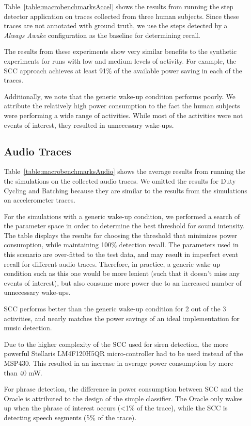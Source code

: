 Table~\ref{table:macrobenchmarksAccel} shows the results from running the
step detector application on traces collected from three human
subjects.  Since these traces are not annotated with ground truth, we
use the steps detected by a {\em Always Awake} configuration as the baseline for
determining recall.

The results from these experiments show very similar
benefits to the synthetic experiments for runs with low and medium
levels of activity.  For example, the SCC approach achieves
at least 91\% of the available power saving in each of the traces.  

Additionally, we note that the generic wake-up condition performs poorly.  We 
attribute the relatively high power consumption to the fact the human subjects 
were performing a wide range of activities.  While most of the activities were 
not events of interest, they resulted in unnecessary wake-ups.



\subsection{Audio Traces}

Table~\ref{table:macrobenchmarksAudio} shows the average results from running the
the simulations on the collected audio traces.  We omitted the results
for Duty Cycling and Batching because they are similar to the results from
the simulations on accelerometer traces.

For the simulations with a generic wake-up condition, we performed a search
of the parameter space in order to determine the best threshold for sound 
intensity.  The table displays the results for choosing the threshold that
minimizes power consumption, while maintaining 100\% detection recall.
The parameters used in this scenario are over-fitted to the test data, and 
may result in imperfect event recall for different audio traces.  Therefore, 
in practice, a generic wake-up condition such as this one would be more 
lenient (such that it doesn't miss any events of interest), but also consume
more power due to an increased number of unnecessary wake-ups.

SCC performs better than the generic wake-up condition for 2 out of the 3
activities, and nearly matches the power savings of an ideal 
implementation for music detection.  

Due to the higher complexity of the SCC used for siren detection, the more 
powerful Stellaris LM4F120H5QR micro-controller had to be used instead of
the MSP430.  This resulted in an increase in average power consumption by 
more than 40 mW.

For phrase detection, the difference in power consumption between SCC and
the Oracle is attributed to the design of the simple classifier.  The Oracle 
only wakes up when the phrase of interest occurs (<1\% of the trace), while
the SCC is detecting speech segments (5\% of the trace).
